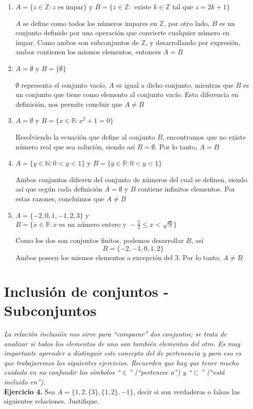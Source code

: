 \begin{enumerate}
	\item $A = \{ z \in \mathbb{Z} : z \text{ es impar} \}$ y $B = \{ z \in \mathbb{Z}: \text{ existe } k \in \mathbb{Z} \text{ tal que } z = 2k + 1 \}$
	
	$A$ se define como todos los n\'umeros impares en $\mathbb{Z}$, por otro lado, $B$ es un conjunto definido por una operaci\'on que convierte cualquier n\'umero en impar. Como ambos son subconjuntos de $\mathbb{Z}$, y desarrollando por expresi\'on, ambos contienen los mismos elementos, entonces $A = B$
	
	\item $A = \emptyset$ y $B = \{\emptyset\}$
	
	$\emptyset$ representa el conjunto vac\'io, $A$ es igual a dicho conjunto, mientras que $B$ es un conjunto que tiene como elemento al conjunto vac\'io. Esta diferencia en definici\'on, nos permite concluir que $A \neq B$
	
	\item $A = \emptyset$ y $B = \{ x \in \mathbb{R}: x^2 + 1= 0 \}$
	
	Resolviendo la ecuaci\'on que define al conjunto $B$, encontramos que no existe n\'umero real que sea soluci\'on, siendo as\'i $B = \emptyset$. Por lo tanto, $A = B$
	
	\item $A = \{ y \in \mathbb{N}: 0 < y < 1 \}$ y $B = \{ y \in \mathbb{R}: 0 < y < 1 \}$
	
	Ambos conjuntos difieren del conjunto de n\'umeros del cual se definen, siendo as\'i que seg\'un cada definici\'on $A = \emptyset$ y $B$ contiene infinitos elementos. Por estas razones, concluimos que $A \neq B$
	
	\item $A = \{ -2, 0, 1, -1, 2, 3 \}$ y $B = \{ x \in \mathbb{R}: x \text{ es un n\'umero entero y } -\frac{5}{2} \leq x < \sqrt{9} \}$
	
	Como los dos son conjuntos finitos, podemos desarrollar $B$, as\'i $$B = \{-2, -1, 0, 1, 2\}$$ Ambos poseen los mismos elementos a excepci\'on del 3. Por lo tanto, $A \neq B$
\end{enumerate}

\section{Inclusión de conjuntos - Subconjuntos}

\textit{La relación inclusión nos sirve para “comparar” dos conjuntos; se trata de analizar si todos los elementos de uno 	son también elementos del otro. Es muy importante aprender a distinguir este concepto del de pertenencia y para eso
es que trabajaremos los siguientes ejercicios. Recuerden que hay que tener mucho cuidado en no confundir los símbolos
“$\in$” (“pertenece a”) y “$\subset$” (“está incluido en”).}\\

\textbf{Ejercicio 4.} Sea $A = \{1, 2, \{3\}, \{1, 2\}, -1\}$, decir si son verdaderas o falsas las siguientes relaciones. Justifique.